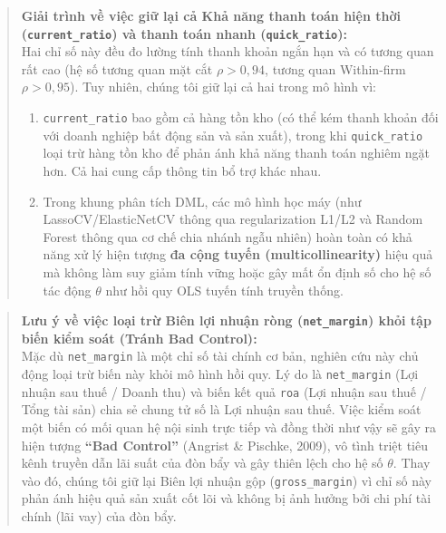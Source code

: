 \documentclass[12pt,a4paper]{article}
\begin{document}
\begin{quote}
\textbf{Giải trình về việc giữ lại cả Khả năng thanh toán hiện thời (\texttt{current\_ratio}) và thanh toán nhanh (\texttt{quick\_ratio}):} \\
Hai chỉ số này đều đo lường tính thanh khoản ngắn hạn và có tương quan rất cao (hệ số tương quan mặt cắt $\rho > 0,94$, tương quan Within-firm $\rho > 0,95$). Tuy nhiên, chúng tôi giữ lại cả hai trong mô hình vì:
\begin{enumerate}
    \item \texttt{current\_ratio} bao gồm cả hàng tồn kho (có thể kém thanh khoản đối với doanh nghiệp bất động sản và sản xuất), trong khi \texttt{quick\_ratio} loại trừ hàng tồn kho để phản ánh khả năng thanh toán nghiêm ngặt hơn. Cả hai cung cấp thông tin bổ trợ khác nhau.
    \item Trong khung phân tích DML, các mô hình học máy (như LassoCV/ElasticNetCV thông qua regularization L1/L2 và Random Forest thông qua cơ chế chia nhánh ngẫu nhiên) hoàn toàn có khả năng xử lý hiện tượng \textbf{đa cộng tuyến (multicollinearity)} hiệu quả mà không làm suy giảm tính vững hoặc gây mất ổn định số cho hệ số tác động $\theta$ như hồi quy OLS tuyến tính truyền thống.
\end{enumerate}
\end{quote}

\begin{quote}
\textbf{Lưu ý về việc loại trừ Biên lợi nhuận ròng (\texttt{net\_margin}) khỏi tập biến kiểm soát (Tránh Bad Control):} \\
Mặc dù \texttt{net\_margin} là một chỉ số tài chính cơ bản, nghiên cứu này chủ động loại trừ biến này khỏi mô hình hồi quy. Lý do là \texttt{net\_margin} (Lợi nhuận sau thuế / Doanh thu) và biến kết quả \texttt{roa} (Lợi nhuận sau thuế / Tổng tài sản) chia sẻ chung tử số là Lợi nhuận sau thuế. Việc kiểm soát một biến có mối quan hệ nội sinh trực tiếp và đồng thời như vậy sẽ gây ra hiện tượng \textbf{``Bad Control''} (Angrist \& Pischke, 2009), vô tình triệt tiêu kênh truyền dẫn lãi suất của đòn bẩy và gây thiên lệch cho hệ số $\theta$. Thay vào đó, chúng tôi giữ lại Biên lợi nhuận gộp (\texttt{gross\_margin}) vì chỉ số này phản ánh hiệu quả sản xuất cốt lõi và không bị ảnh hưởng bởi chi phí tài chính (lãi vay) của đòn bẩy.
\end{quote}
\end{document}
